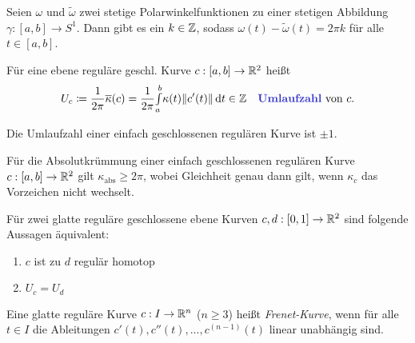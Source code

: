 \documentclass{cheat-sheet}
\newcommand{\Intabdt}[1]{\Int{a}{b}{#1}{t}}
\begin{document}
\begin{satz}
  Seien $\omega$ und $\tilde\omega$ zwei stetige Polarwinkelfunktionen zu einer stetigen Abbildung $\gamma : [a, b] \to S^1$. Dann gibt es ein $k \in \mathbb{Z}$, sodass $\omega(t) - \tilde\omega(t) = 2 \pi k$ für alle $t \in [a, b]$.
\end{satz}

\begin{satz}
  Für eine ebene reguläre geschl. Kurve $c : [a, b] \to \mathbb{R}^2$ heißt
  \[
    U_c \coloneqq \frac{1}{2 \pi} \overline\kappa(c) = \frac{1}{2 \pi} \Intabdt{\kappa(t) \norm{c'(t)}} \in \Z
    \quad \text{\emph{Umlaufzahl} von $c$}.
  \]
\end{satz}

\begin{satz}
  Die Umlaufzahl einer einfach geschlossenen regulären Kurve ist $\pm 1$.
\end{satz}

\begin{satz}
  Für die Absolutkrümmung einer einfach geschlossenen regulären Kurve $c : [a, b] \to \mathbb{R}^2$ gilt $\kappa_{\text{abs}} \geq 2 \pi$, wobei Gleichheit genau dann gilt, wenn $\kappa_c$ das Vorzeichen nicht wechselt.
\end{satz}


\begin{satz}
  Für zwei glatte reguläre geschlossene ebene Kurven $c, d : \left[ 0, 1 \right] \to \mathbb{R}^2$ sind folgende Aussagen äquivalent:
  \begin{multicols}{2}
    \begin{enumerate}[label=(\roman*),leftmargin=2em]
      \item $c$ ist zu $d$ regulär homotop
      \item $U_c = U_d$
    \end{enumerate}
  \end{multicols}
\end{satz}



\begin{defn}
  Eine glatte reguläre Kurve $c : I \to \mathbb{R}^n$ ($n \geq 3$) heißt \emph{Frenet-Kurve}, wenn für alle $t \in I$ die Ableitungen $c'(t), c''(t), ..., c^{(n-1)}(t)$ linear unabhängig sind.
\end{defn}
\end{document}
